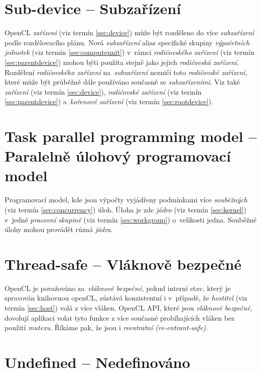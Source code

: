 \section{Sub-device -- Subzařízení}
\label{sec:subdevice}

OpenCL \emph{zařízení} (viz termín \ref{sec:device}) může být rozděleno do více \emph{subzařízení} podle rozdělovacího plánu. Nová \emph{subzařízení} alias specifické skupiny \emph{výpočetních jednotek} (viz termín \ref{sec:computeunit}) v~rámci
\emph{rodičovského zařízení} (viz termín \ref{sec:parentdevice}) mohou býti použita stejně jako jejich \emph{rodičovská zařízení}. Rozdělení \emph{rodičovského zařízení} na~\emph{subzařízení} nezničí toto \emph{rodičovské zařízení}, které může být průběžně dále používáno současně se \emph{subzařízeními}. Viz také \emph{zařízení} (viz termín \ref{sec:device}), \emph{rodičovské zařízení} (viz termín \ref{sec:parentdevice}) a~\emph{kořenové zařízení} (viz termín \ref{sec:rootdevice}).

\section{Task parallel programming model -- Paralelně úlohový programovací model}
\label{sec:taskparallelprogrammingmodel}

Programovací model, kde jsou výpočty vyjádřeny podmínkami více \emph{souběžných} (viz termín \ref{sec:concurrency}) úloh. Úloha je zde \emph{jádro} (viz termín \ref{sec:kernel}) v~jedné \emph{pracovní skupině} (viz termín \ref{sec:workgroup}) o~velikosti jedna. Souběžné úlohy mohou provádět různá \emph{jádra}.

\section{Thread-safe -- Vláknově bezpečné}
\label{sec:threadsafe}

OpenCL je považováno za~\emph{vláknově bezpečné}, pokud interní stav, který je spravován knihovnou openCL, zůstává konzistentní i v~případě, že \emph{hostitel} (viz termín \ref{sec:host}) volá
z více vláken. OpenCL API, které jsou \emph{vláknově bezpečné}, dovolují aplikaci volat tyto funkce z více současné probíhajících vláken bez použití \emph{mutexu}. Říkáme pak, že jsou i \emph{reentratní (re-entrant-safe)}.


\section{Undefined -- Nedefinováno}
\label{sec:undefined}

